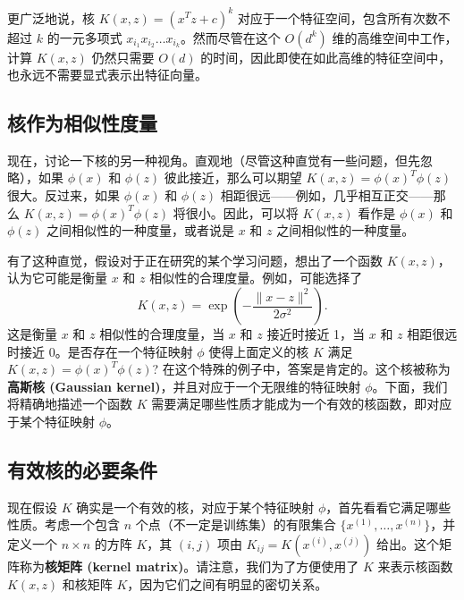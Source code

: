 更广泛地说，核 $K(x, z) = (x^T z + c)^k$ 对应于一个特征空间，包含所有次数不超过 $k$ 的一元多项式 $x_{i_1} x_{i_2} \dots x_{i_k}$。然而尽管在这个 $O(d^k)$ 维的高维空间中工作，计算 $K(x, z)$ 仍然只需要 $O(d)$ 的时间，因此即使在如此高维的特征空间中，也永远不需要显式表示出特征向量。

\subsection*{核作为相似性度量}

现在，讨论一下核的另一种视角。直观地（尽管这种直觉有一些问题，但先忽略），如果 $\phi(x)$ 和 $\phi(z)$ 彼此接近，那么可以期望 $K(x, z) = \phi(x)^T \phi(z)$ 很大。反过来，如果 $\phi(x)$ 和 $\phi(z)$ 相距很远——例如，几乎相互正交——那么 $K(x, z) = \phi(x)^T \phi(z)$ 将很小。因此，可以将 $K(x, z)$ 看作是 $\phi(x)$ 和 $\phi(z)$ 之间相似性的一种度量，或者说是 $x$ 和 $z$ 之间相似性的一种度量。

有了这种直觉，假设对于正在研究的某个学习问题，想出了一个函数 $K(x, z)$，认为它可能是衡量 $x$ 和 $z$ 相似性的合理度量。例如，可能选择了
\[
    K(x, z) = \exp \left( -\frac{\|x - z\|^2}{2\sigma^2} \right).
\]
这是衡量 $x$ 和 $z$ 相似性的合理度量，当 $x$ 和 $z$ 接近时接近 1，当 $x$ 和 $z$ 相距很远时接近 0。是否存在一个特征映射 $\phi$ 使得上面定义的核 $K$ 满足 $K(x, z) = \phi(x)^T \phi(z)$? 在这个特殊的例子中，答案是肯定的。这个核被称为\textbf{高斯核 (Gaussian kernel)}，并且对应于一个无限维的特征映射 $\phi$。下面，我们将精确地描述一个函数 $K$ 需要满足哪些性质才能成为一个有效的核函数，即对应于某个特征映射 $\phi$。

\subsection*{有效核的必要条件}

现在假设 $K$ 确实是一个有效的核，对应于某个特征映射 $\phi$，首先看看它满足哪些性质。考虑一个包含 $n$ 个点（不一定是训练集）的有限集合 $\{x^{(1)}, \dots, x^{(n)}\}$，并定义一个 $n \times n$ 的方阵 $K$，其 $(i, j)$ 项由 $K_{ij} = K(x^{(i)}, x^{(j)})$ 给出。这个矩阵称为\textbf{核矩阵 (kernel matrix)}。请注意，我们为了方便使用了 $K$ 来表示核函数 $K(x, z)$ 和核矩阵 $K$，因为它们之间有明显的密切关系。

